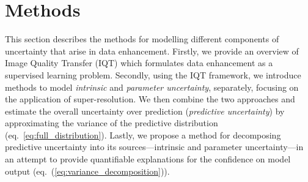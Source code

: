 \section{Methods}
This section describes the methods for modelling different components of uncertainty that arise in data enhancement. Firstly, we provide an overview of Image Quality Transfer (IQT) which formulates data enhancement as a supervised learning problem. Secondly, using the IQT framework, we introduce methods to model \textit{intrinsic} and \textit{parameter uncertainty}, separately, focusing on the application of super-resolution. We then combine the two approaches and estimate the overall uncertainty over prediction (\textit{predictive uncertainty}) by approximating the variance of the predictive distribution (eq.~\eqref{eq:full_distribution}). Lastly, we propose a method for decomposing predictive uncertainty into its sources---intrinsic and parameter uncertainty---in an attempt to provide quantifiable explanations for the confidence on model output (eq.~(\ref{eq:variance_decomposition})). 



